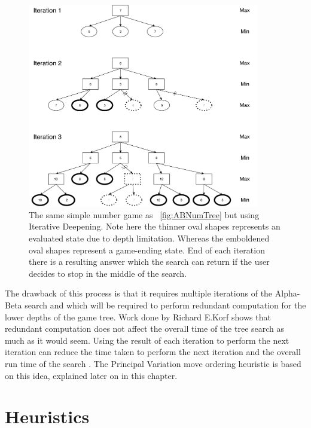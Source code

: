 \documentclass{l4proj}
\begin{document}
\begin{figure}[!ht]
\centering
\includegraphics[width=0.9\textwidth]{ABNumIDeep.pdf}
\caption{ The same simple number game as ~\autoref{fig:ABNumTree} but using Iterative Deepening. Note here the thinner oval shapes represents an evaluated state due to depth limitation. Whereas the emboldened oval shapes represent a game-ending state. End of each iteration there is a resulting answer which the search can return if the user decides to stop in the middle of the search.}
\label{fig:iter-deep}
\end{figure}


The drawback of this process is that it requires multiple iterations of the Alpha-Beta search and which will be required to perform redundant computation for the lower depths of the game tree. Work done by Richard E.Korf  shows that redundant computation does not affect the overall time of the tree search as much as it would seem. Using the result of each iteration to perform the next iteration can reduce the time taken to perform the next iteration and the overall run time of the search \citep{Korf1985}. The Principal Variation move ordering heuristic is based on this idea, explained later on in this chapter.




\section{Heuristics}
\end{document}
